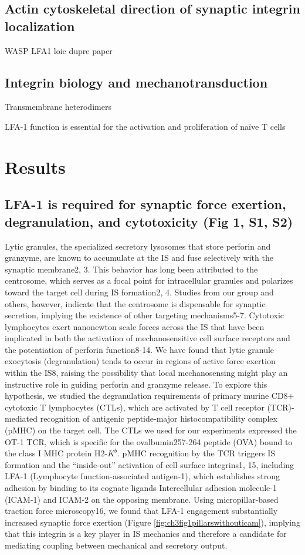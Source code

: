 \subsection{Actin cytoskeletal direction of synaptic integrin localization}
WASP LFA1 loic dupre paper

\subsection{Integrin biology and mechanotransduction}
Transmembrane heterodimers 

LFA-1 function is essential for the activation and proliferation of na{\"i}ve T cells \cite{Wang2009}

\section{Results}

\subsection{LFA-1 is required for synaptic force exertion, degranulation, and cytotoxicity (Fig 1, S1, S2)}
Lytic granules, the specialized secretory lysosomes that store perforin and granzyme, are known to accumulate at the IS and fuse selectively with the synaptic membrane2, 3. This behavior has long been attributed to the centrosome, which serves as a focal point for intracellular granules and polarizes toward the target cell during IS formation2, 4. Studies from our group and others, however, indicate that the centrosome is dispensable for synaptic secretion, implying the existence of other targeting mechanisms5-7. Cytotoxic lymphocytes exert nanonewton scale forces across the IS that have been implicated in both the activation of mechanosensitive cell surface receptors and the potentiation of perforin function8-14. We have found that lytic granule exocytosis (degranulation) tends to occur in regions of active force exertion within the IS8, raising the possibility that local mechanosensing might play an instructive role in guiding perforin and granzyme release. To explore this hypothesis, we studied the degranulation requirements of primary murine CD8+ cytotoxic T lymphocytes (CTLs), which are activated by T cell receptor (TCR)-mediated recognition of antigenic peptide-major histocompatibility complex (pMHC) on the target cell. The CTLs we used for our experiments expressed the OT-1 TCR, which is specific for the ovalbumin257-264 peptide (OVA) bound to the class I MHC protein H2-$K^{b}$. pMHC recognition by the TCR triggers IS formation and the “inside-out” activation of cell surface integrins1, 15, including LFA-1 (Lymphocyte function-associated antigen-1), which establishes strong adhesion by binding to its cognate ligands Intercellular adhesion molecule-1 (ICAM-1) and ICAM-2 on the opposing membrane. Using micropillar-based traction force microscopy16, we found that LFA-1 engagement substantially increased synaptic force exertion (Figure \ref{fig:ch3fig1pillarswithouticam}), implying that this integrin is a key player in IS mechanics and therefore a candidate for mediating coupling between mechanical and secretory output. 

